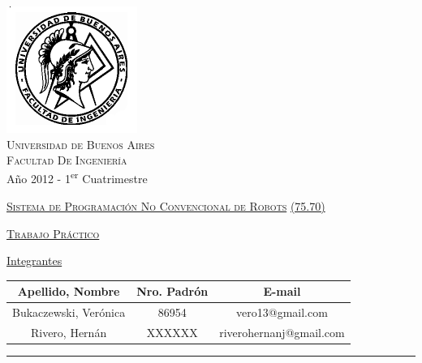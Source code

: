 \documentclass[12pt,titlepage]{article}
\begin{document}
\begin{titlepage}

\thispagestyle{empty}

\begin{center}
\includegraphics[scale=0.55]{./Images/fiuba}\\
\large{\textsc{Universidad de Buenos Aires}}\\
\large{\textsc{Facultad De Ingeniería}}\\
\small{Año 2012 - 1\textsuperscript{er} Cuatrimestre}
\end{center}

\vfill

\begin{center}

\Large{\underline{\textsc{Sistema de Programaci\'on No Convencional de Robots}}}
\Large{\underline{\textsc{(75.70)}}}

\vfill


\Large{\underline{\textsc{Trabajo Pr\'actico}}}

\vfill

\Large\underline{Integrantes} \linebreak\linebreak

\large\addtolength{\tabcolsep}{-3pt}
\begin{tabular}{|| c | c | c ||}
\hline
\textbf{Apellido, Nombre} & \textbf{Nro. Padrón} & \textbf{E-mail} \\
\hline
Bukaczewski, Verónica & 86954 & vero13@gmail.com \\
\hline
Rivero, Hern\'an & XXXXXX & riverohernanj@gmail.com \\
\hline
\end{tabular}
\end{center}

\vfill

\hrule
\vspace{0.2cm}


\end{titlepage}
\end{document}

